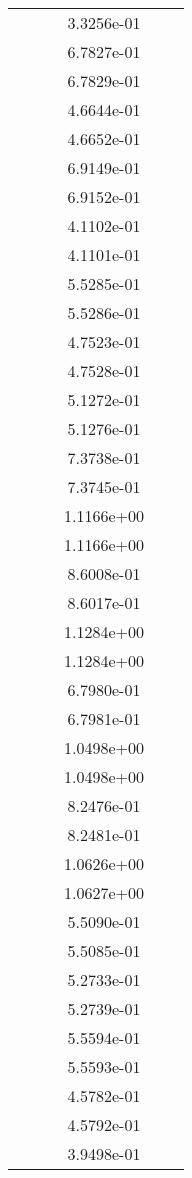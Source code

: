 \begin{xltabular}{\textwidth}{r|rS[table-format=1.3e+2]S[table-format=1.4e+2]S[table-format=1.4e+2]S[table-format=-1.5]}
&  &  & 3.3256e-01 & & \\
&  &  & 6.7827e-01 & & \\
&  &  & 6.7829e-01 & & \\
&  &  & 4.6644e-01 & & \\
&  &  & 4.6652e-01 & & \\
&  &  & 6.9149e-01 & & \\
&  &  & 6.9152e-01 & & \\
&  &  & 4.1102e-01 & & \\
&  &  & 4.1101e-01 & & \\
&  &  & 5.5285e-01 & & \\
&  &  & 5.5286e-01 & & \\
&  &  & 4.7523e-01 & & \\
&  &  & 4.7528e-01 & & \\
&  &  & 5.1272e-01 & & \\
&  &  & 5.1276e-01 & & \\
&  &  & 7.3738e-01 & & \\
&  &  & 7.3745e-01 & & \\
&  &  & 1.1166e+00 & & \\
&  &  & 1.1166e+00 & & \\
&  &  & 8.6008e-01 & & \\
&  &  & 8.6017e-01 & & \\
&  &  & 1.1284e+00 & & \\
&  &  & 1.1284e+00 & & \\
&  &  & 6.7980e-01 & & \\
&  &  & 6.7981e-01 & & \\
&  &  & 1.0498e+00 & & \\
&  &  & 1.0498e+00 & & \\
&  &  & 8.2476e-01 & & \\
&  &  & 8.2481e-01 & & \\
&  &  & 1.0626e+00 & & \\
&  &  & 1.0627e+00 & & \\
&  &  & 5.5090e-01 & & \\
&  &  & 5.5085e-01 & & \\
&  &  & 5.2733e-01 & & \\
&  &  & 5.2739e-01 & & \\
&  &  & 5.5594e-01 & & \\
&  &  & 5.5593e-01 & & \\
&  &  & 4.5782e-01 & & \\
&  &  & 4.5792e-01 & & \\
&  &  & 3.9498e-01 & & \\

\end{xltabular}
